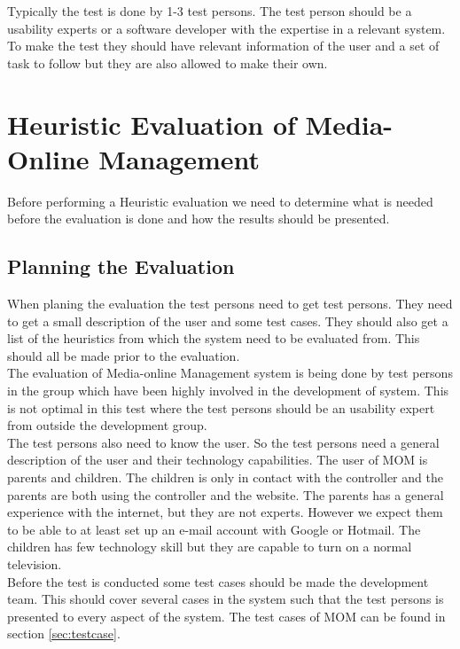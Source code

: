 Typically the test is done by 1-3 test persons\citep{HeuristicEvaluation}. The test person should be a usability experts or a software developer with the expertise in a relevant system. To make the test they should have relevant information of the user and a set of task to follow but they are also allowed to make their own.


\section{Heuristic Evaluation of Media-Online Management}
Before performing a Heuristic evaluation we need to determine what is needed before the evaluation is done and how the results should be presented\citep{HeuristicEvaluationGuide}.

\subsection{Planning the Evaluation}
When planing the evaluation the test persons need to get test persons. They need to get a small description of the user and some test cases. They should also get a list of the heuristics from which the system need to be evaluated from. This should all be made prior to the evaluation. \\

The evaluation of Media-online Management system is being done by test persons in the group which have been highly involved in the development of system. This is not optimal in this test where the test persons should be an usability expert from outside the development group\citep{DIEB}.\\

The test persons also need to know the user. So the test persons need a general description of the user and their technology capabilities. The user of MOM is parents and children. The children is only in contact with the controller and the parents are both using the controller and the website. The parents has a general experience with the internet, but they are not experts. However we expect them to be able to at least set up an e-mail account with Google or Hotmail. The children has few technology skill but they are capable to turn on a normal television. \\

Before the test is conducted some test cases should be made the development team. This should cover several cases in the system such that the test persons is presented to every aspect of the system. The test cases of MOM can be found in section \vref{sec:testcase}.\\ 


